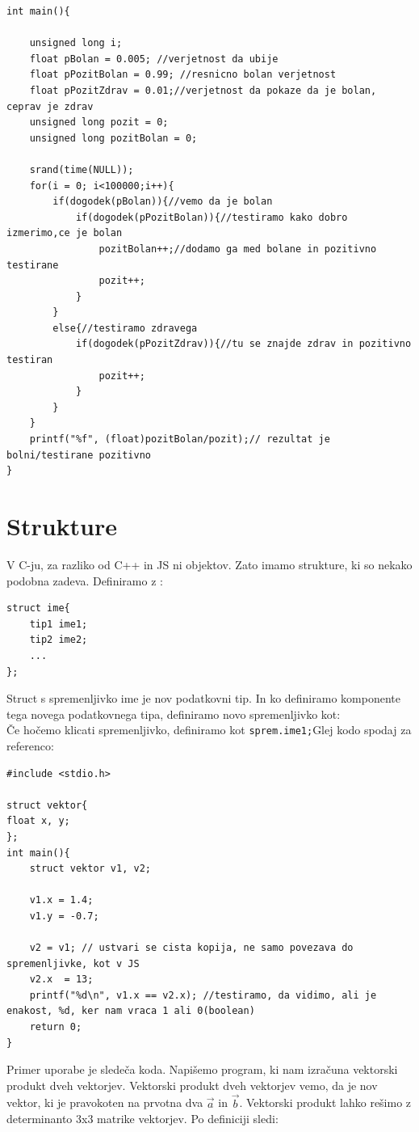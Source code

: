 \documentclass[a4paper, 12pt]{article}
\begin{document}
\begin{lstlisting}
int main(){

    unsigned long i;
	float pBolan = 0.005; //verjetnost da ubije
	float pPozitBolan = 0.99; //resnicno bolan verjetnost
	float pPozitZdrav = 0.01;//verjetnost da pokaze da je bolan, ceprav je zdrav
	unsigned long pozit = 0;
	unsigned long pozitBolan = 0;
	
	srand(time(NULL));
	for(i = 0; i<100000;i++){
		if(dogodek(pBolan)){//vemo da je bolan
			if(dogodek(pPozitBolan)){//testiramo kako dobro izmerimo,ce je bolan
				pozitBolan++;//dodamo ga med bolane in pozitivno testirane
				pozit++;
			}
		}
		else{//testiramo zdravega
			if(dogodek(pPozitZdrav)){//tu se znajde zdrav in pozitivno testiran
				pozit++;
			}
		}
	}
	printf("%f", (float)pozitBolan/pozit);// rezultat je bolni/testirane pozitivno
}
\end{lstlisting}

\section{Strukture}

V C-ju, za razliko od C++ in JS ni objektov. Zato imamo strukture, ki so nekako podobna zadeva. Definiramo z :
\begin{lstlisting}
struct ime{
	tip1 ime1;
	tip2 ime2;
	...
};
\end{lstlisting}
Struct s spremenljivko ime je nov podatkovni tip. In ko definiramo komponente tega novega podatkovnega tipa, definiramo novo spremenljivko kot: {\centering{}}\\
Če hočemo klicati spremenljivko, definiramo kot \lstinline|sprem.ime1;|Glej kodo spodaj za referenco:

\begin{lstlisting}
#include <stdio.h>

struct vektor{
float x, y;		
};
int main(){
	struct vektor v1, v2;

	v1.x = 1.4;	
	v1.y = -0.7;

	v2 = v1; // ustvari se cista kopija, ne samo povezava do spremenljivke, kot v JS
	v2.x  = 13;
	printf("%d\n", v1.x == v2.x); //testiramo, da vidimo, ali je enakost, %d, ker nam vraca 1 ali 0(boolean)
	return 0;
}
\end{lstlisting}


Primer uporabe  je sledeča koda. Napišemo program, ki nam izračuna vektorski produkt dveh vektorjev. Vektorski produkt dveh vektorjev vemo, da je nov vektor, ki je pravokoten na prvotna dva $\vec{a}$ in $\vec{b}$. Vektorski produkt lahko rešimo z determinanto 3x3 matrike vektorjev. Po definiciji sledi:\\
\end{document}
